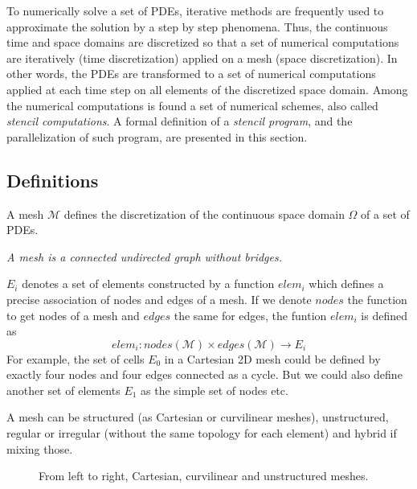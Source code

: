 To numerically solve a set of PDEs, iterative methods are frequently used to approximate the solution by a step by step phenomena. Thus, the continuous time and space domains are discretized so that a set of numerical computations are iteratively (time discretization) applied on a mesh (space discretization). In other words, the PDEs are transformed to a set of numerical computations applied at each time step on all elements of the discretized space domain. Among the numerical computations is found a set of numerical schemes, also called \textit{stencil computations}.
A formal definition of a \textit{stencil program}, and the parallelization of such program, are presented in this section.

\subsection{Definitions}

A mesh $\mathcal{M}$ defines the discretization of the continuous space domain $\Omega$ of a set of PDEs. 

\medskip
\begin{mydef}
\textit{A mesh is a connected undirected graph without bridges.}
\end{mydef}

$E_i$ denotes a set of elements constructed by a function $elem_i$ which defines a precise association of nodes and edges of a mesh. If we denote $nodes$ the function to get nodes of a mesh and $edges$ the same for edges, the funtion $elem_i$ is defined as
\begin{equation*}
elem_i : nodes(\mathcal{M}) \times edges(\mathcal{M}) \rightarrow E_i
\end{equation*}
For example, the set of cells $E_0$ in a Cartesian 2D mesh could be defined by exactly four nodes and four edges connected as a cycle. But we could also define another set of elements $E_1$ as the simple set of nodes etc.

A mesh can be structured (as Cartesian or curvilinear meshes), unstructured, regular or irregular (without the same topology for each element) and hybrid if mixing those. 

\begin{figure}[!h]\begin{center}
  \caption{From left to right, Cartesian, curvilinear and unstructured meshes.}
  \label{fig:mesh}
\end{center}\end{figure}

